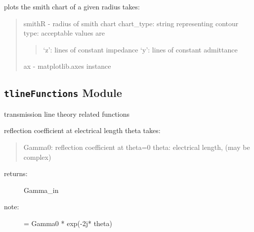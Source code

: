 \documentclass[letterpaper,10pt,english]{sphinxmanual}
\begin{document}
\begin{fulllineitems}
\label{api/mwavepy:mwavepy.plotting.smith}
plots the smith chart of a given radius
takes:
\begin{quote}

smithR - radius of smith chart
chart\_type: string representing contour type: acceptable values are
\begin{quote}

`z': lines of constant impedance
`y': lines of constant admittance
\end{quote}

ax - matplotlib.axes instance
\end{quote}

\end{fulllineitems}



\subsection{\texttt{tlineFunctions} Module}
\label{api/mwavepy:module-mwavepy.tlineFunctions}\label{api/mwavepy:tlinefunctions-module}
transmission line theory related functions

\begin{fulllineitems}
\label{api/mwavepy:mwavepy.tlineFunctions.Gamma0_2_Gamma_in}
reflection coefficient at electrical length theta
takes:
\begin{quote}

Gamma0: reflection coefficient at theta=0
theta: electrical length, (may be complex)
\end{quote}
\begin{description}
\item[{returns:}] \leavevmode
Gamma\_in

\item[{note: }] \leavevmode
= Gamma0 * exp(-2j* theta)

\end{description}

\end{fulllineitems}

\end{document}

